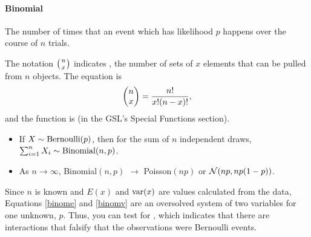 \paragraph{Binomial}

The number of times that an event which has likelihood $p$ happens over the
course of $n$ trials.

The notation $\left({n\atop x}\right)$ indicates
, the number of sets of $x$ elements that can be
pulled from $n$ objects. The equation is $$\left(\begin{matrix}n\cr x\end{matrix}\right) =
{n!\over x!(n-x)!},$$ and the function is  
(in the GSL's Special Functions section).
 

 

\begin{itemize}
\item If $X \sim {\rm Bernoulli}(p)$, then for the sum of $n$ independent draws,
$\sum_{i=1}^n X_i \sim {\rm Binomial}(n,p)$.
\item As $n\to\infty$, Binomial$(n,p)$ $\to$ Poisson$(np)$ or ${\cal
N}(np, np(1-p))$.
\end{itemize}

Since $n$ is known and $E(x)$ and $\operatorname{var}(x)$ are values calculated from
the data, Equations \ref{binome} and \ref{binomv} are an oversolved
system of two variables for one unknown, $p$. Thus, you can test for
, which indicates that there are interactions that
falsify that the observations were  Bernoulli events.

